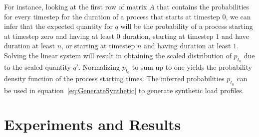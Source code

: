 \documentclass[conference]{IEEEtran}
\begin{document}
For instance, looking at the first row of matrix $A$ that contains the probabilities for every timestep for the duration of a process that starts at timestep $0$, we can infer that the expected quantity for $q$ will be the probability of a process starting at timestep zero and having at least $0$ duration, starting at timestep $1$ and have duration at least $n$, or starting at timestep $n$ and having duration at least $1$. Solving the linear system will result in obtaining the scaled distribution of $p_{t_0}$ due to the scaled quantity $q'$. Normalizing $p_{t_0}$ to sum up to one yields the probability density function of the process starting times. The inferred probabilities $p_{t_0}$ can be used in equation~\eqref{eq:GenerateSynthetic} to generate synthetic load profiles. 


%
%
%
 

\section{Experiments and Results}
\label{sec:Experiments}
\end{document}
